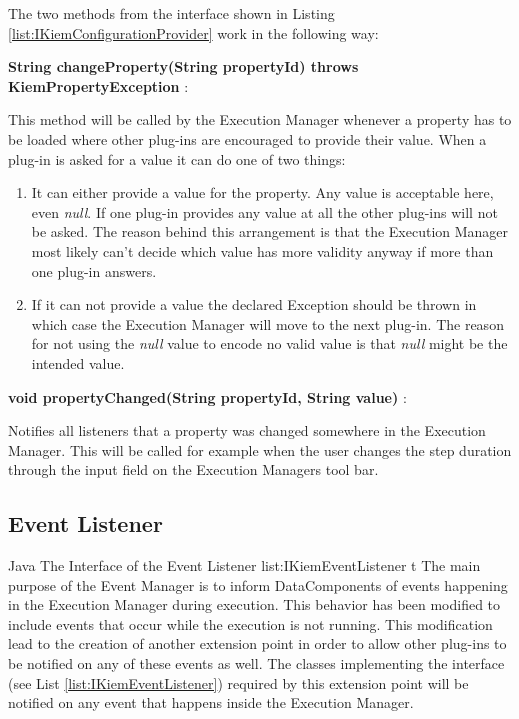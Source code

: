 The two methods from the interface shown in Listing \ref{list:IKiemConfigurationProvider} work
in the following way:

\begin{description}
 \item \textbf{String changeProperty(String propertyId) throws KiemPropertyException} :

This method will be called by the Execution Manager whenever a property has to be loaded where
other plug-ins are encouraged to provide their value. When a plug-in is asked for a value it
can do one of two things:
 \begin{enumerate}
  \item It can either provide a value for the property. Any value is acceptable here, even \textit{null}.
If one plug-in provides any value at all the other plug-ins will not be asked. The reason behind this arrangement
is that the Execution Manager most likely can't decide which value has more validity anyway if more than one
plug-in answers.
  \item If it can not provide a value the declared Exception should be thrown in which case the Execution
Manager will move to the next plug-in. The reason for not using the \textit{null} value to encode no valid value
is that \textit{null} might be the intended value.
 \end{enumerate}

 \item \textbf{void propertyChanged(String propertyId, String value)} :

Notifies all listeners that a property was changed somewhere in the Execution Manager. This will be called for example
when the user changes the step duration through the input field on the Execution Managers tool bar.
\end{description}

\subsection{Event Listener}
\label{section:EventListener}
\listingjava
{}
{Java}
{The Interface of the Event Listener}
{list:IKiemEventListener}
{t}
The main purpose of the Event Manager is to inform DataComponents of events
happening in the Execution Manager during execution. This behavior has been modified to include 
events that occur while the execution is not running. This modification lead to the 
creation of another extension point in order to allow other plug-ins to be notified
on any of these events as well. The classes implementing the interface 
(see List \ref{list:IKiemEventListener}) required by this extension point will be notified
on any event that happens inside the Execution Manager.

